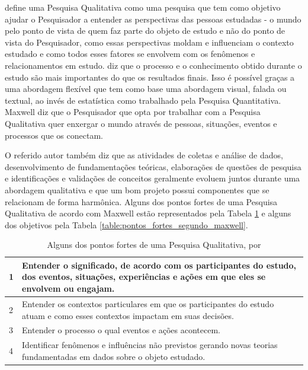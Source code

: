  define uma Pesquisa Qualitativa como uma pesquisa que tem como objetivo ajudar o Pesquisador a entender as perspectivas das pessoas estudadas - o mundo pelo ponto de vista de quem faz parte do objeto de estudo e não do ponto de vista do Pesquisador, como essas perspectivas moldam e influenciam o contexto estudado e como todos esses fatores se envolvem com os fenômenos e relacionamentos em estudo.  diz que o processo e o conhecimento obtido durante o estudo são mais importantes do que os resultados finais. Isso é possível graças a uma abordagem flexível que tem como base uma abordagem visual, falada ou textual, ao invés de estatística como trabalhado pela Pesquisa Quantitativa. Maxwell diz que o Pesquisador que opta por trabalhar com a Pesquisa Qualitativa quer enxergar o mundo através de pessoas, situações, eventos e processos que os conectam.

O referido autor também diz que as atividades de coletas e análise de dados, desenvolvimento de fundamentações teóricas, elaborações de questões de pesquisa e identificações e validações de conceitos geralmente evoluem juntos durante uma abordagem qualitativa e que um bom projeto possui componentes que se relacionam de forma harmônica. Alguns dos pontos fortes de uma Pesquisa Qualitativa de acordo com Maxwell estão representados pela Tabela \ref{table:objetivos_intelectuais_segundo_maxwell} e alguns dos objetivos pela Tabela \ref{table:pontos_fortes_segundo_maxwell}.

\begin{table}[!htb]
	\centering
	\begin{tabular}{ | p{3cm} | p{12cm} | }
		\hline
		1 & Entender o significado, de acordo com os participantes do estudo, dos eventos, situações, experiências e ações em que eles se envolvem ou engajam. \\ \hline
		2 & Entender os contextos particulares em que os participantes do estudo atuam e como esses contextos impactam em suas decisões. \\ \hline
		3 & Entender o processo o qual eventos e ações acontecem. \\ \hline
		4 & Identificar fenômenos e influências não previstos gerando novas teorias fundamentadas em dados sobre o objeto estudado. \\ \hline
	\end{tabular}
	\caption{Alguns dos pontos fortes de uma Pesquisa Qualitativa, por \cite{Maxwell2013}}
	\label{table:objetivos_intelectuais_segundo_maxwell}
\end{table}

